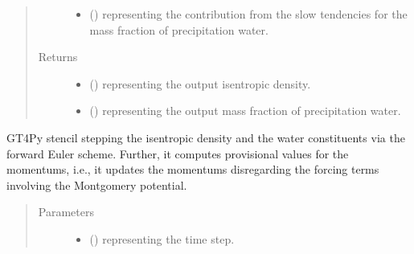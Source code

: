 \documentclass[letterpaper,10pt,english]{sphinxmanual}
\begin{document}
\begin{fulllineitems}
\begin{fulllineitems}
\begin{quote}
\begin{description}
\begin{itemize}
\item {} 
 () \textendash{}  representing the contribution from the slow tendencies for the mass fraction of
precipitation water.

\end{itemize}

\item[{Returns}] \leavevmode
\begin{itemize}
\item {} 
 () \textendash{}  representing the output isentropic density.

\item {} 
 () \textendash{}  representing the output mass fraction of precipitation water.

\end{itemize}


\end{description}\end{quote}

\end{fulllineitems}


\begin{fulllineitems}
\label{\detokenize{api:tasmania.dycore.prognostic_isentropic_forward_euler.PrognosticIsentropicForwardEuler._stencil_stepping_by_neglecting_vertical_advection_first_defs}}
GT4Py stencil stepping the isentropic density and the water constituents via the forward Euler scheme.
Further, it computes provisional values for the momentums, i.e., it updates the momentums disregarding
the forcing terms involving the Montgomery potential.
\begin{quote}\begin{description}
\item[{Parameters}] \leavevmode\begin{itemize}
\item {} 
 () \textendash{}  representing the time step.


\end{itemize}
\end{description}
\end{quote}
\end{fulllineitems}
\end{fulllineitems}
\end{document}
